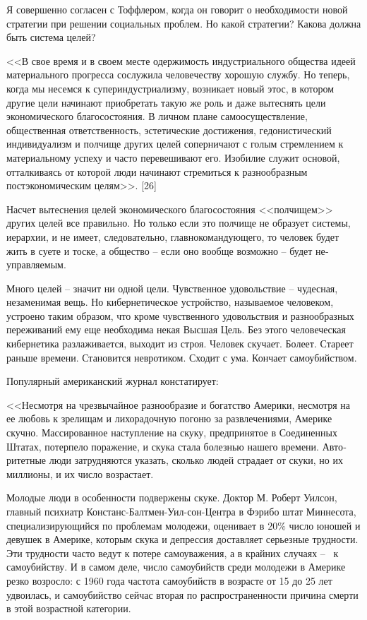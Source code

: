 \documentclass{book}
\begin{document}
Я совершенно согласен с Тоффлером, когда он говорит о необходимости новой стратегии при решении социальных проб­лем. Но какой стратегии? Какова должна быть система целей?

<<В свое время и в своем месте одержимость индустриально­го общества идеей материального прогресса сослужила челове­честву хорошую службу. Но теперь, когда мы несемся к супер­индустриализму, возникает новый этос, в котором другие це­ли начинают приобретать такую же роль и даже вытеснять це­ли экономического благосостояния. В личном плане самоосу­ществление, общественная ответственность, эстетические дости­жения, гедонистический индивидуализм и полчище других це­лей соперничают с голым стремлением к материальному успе­ху и часто перевешивают его. Изобилие служит основой, оттал­киваясь от которой люди начинают стремиться к разнообраз­ным постэкономическим целям>>. [26]

Насчет вытеснения целей экономического благосостояния <<полчищем>> других целей все правильно. Но только если это полчище не образует системы, иерархии,  и не имеет, следовательно, главнокомандующего, то человек будет жить в суете и тоске, а общество -- если оно вообще возможно -- будет не­управляемым.

Много целей -- значит ни одной цели. Чувственное удовольст­вие -- чудесная, незаменимая вещь. Но кибернетическое устрой­ство, называемое человеком, устроено таким образом, что кро­ме чувственного удовольствия и разнообразных переживаний ему еще необходима некая Высшая Цель. Без этого человече­ская кибернетика разлаживается, выходит из строя. Человек ску­чает. Болеет. Стареет раньше времени. Становится невротиком. Сходит с ума. Кончает самоубийством.

Популярный американский журнал констатирует:

<<Несмотря на чрезвычайное разнообразие и богатство Аме­рики, несмотря на ее любовь к зрелищам и лихорадочную пого­ню за развлечениями, Америке скучно. Массированное насту­пление на скуку, предпринятое в Соединенных Штатах, потер­пело поражение, и скука стала болезнью нашего времени. Авто­ритетные люди затрудняются указать, сколько людей страдает от скуки, но их миллионы, и их число возрастает.

Молодые люди в особенности подвержены скуке. Доктор М. Роберт Уилсон, главный психиатр Констанс-Балтмен-Уил-сон-Центра в Фэрибо штат Миннесота, специализирующийся по проблемам молодежи, оценивает в $20\%$ число юношей и де­вушек в Америке, которым скука и депрессия доставляет се­рьезные трудности. Эти трудности часто ведут к потере самоува­жения, а в крайних случаях --  к самоубийству. И в самом деле, число самоубийств среди молодежи в Америке резко возрос­ло: с 1960 года частота самоубийств в возрасте от 15 до 25 лет удвоилась, и самоубийство сейчас вторая по распространенно­сти причина смерти в этой возрастной категории.
\end{document}
